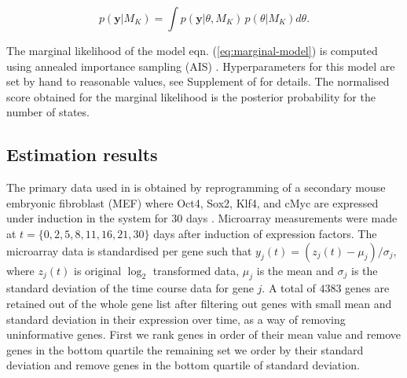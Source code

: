 \begin{equation}
  \label{eq:marginal-model}
  p(\mathbf{y} | M_K) = \int p(\mathbf{y} | \theta, M_K)\, p(\theta | M_K) d\theta.
\end{equation}

The marginal likelihood of the model eqn. (\ref{eq:marginal-model}) is computed using annealed importance sampling (AIS) \citep{Neal:2001ed}. Hyperparameters for this model are set by hand to reasonable values, see Supplement of \cite{Armond:2013} for details. The normalised score obtained for the marginal likelihood is the posterior probability for the number of states.

\subsection{Estimation results}
\label{sec:estimation-results}

The primary data used in \cite{Armond:2013} is obtained by reprogramming of a secondary mouse embryonic fibroblast (MEF) where Oct4, Sox2, Klf4, and cMyc are expressed under induction in the system for 30 days \citep{SamavarchiTehrani:2010cp}. Microarray measurements were made at $t = \lbrace 0, 2, 5, 8, 11, 16, 21, 30 \rbrace$ days after induction of expression factors. The microarray data is standardised per gene such that $y_j(t) = \left(z_j(t) - \mu_j \right) / \sigma_j$, where $z_j(t)$ is original $\log_2$ transformed data, $\mu_j$ is the mean and $\sigma_j$ is the standard deviation of the time course data for gene $j$. A total of $4383$ genes are retained out of the whole gene list after filtering out genes with small mean and standard deviation in their expression over time, as a way of removing uninformative genes. First we rank genes in order of their mean value and remove genes in the bottom quartile the remaining set we order by their standard deviation and remove genes in the bottom quartile of standard deviation.

